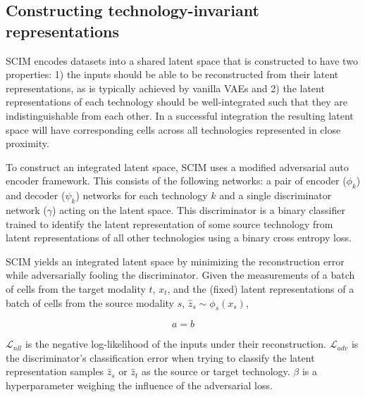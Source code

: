 \subsection{Constructing technology-invariant representations}
SCIM encodes datasets into a shared latent space that is constructed to have two properties:
1) the inputs should be able to be reconstructed from their latent representations, as is typically achieved by vanilla VAEs
and 2) the latent representations of each technology should be well-integrated such that they are indistinguishable from each other.
In a successful integration the resulting latent space will have corresponding cells across all technologies represented in close proximity.

To construct an integrated latent space, SCIM uses a modified adversarial auto encoder framework.
This consists of the following networks: a pair of encoder ($\phi_k$) and decoder ($\psi_k$) networks for each technology $k$ and a single discriminator network ($\gamma$) acting on the latent space.
This discriminator is a binary classifier trained to identify the latent representation of some source technology from latent representations of all other technologies using a binary cross entropy loss.

SCIM yields an integrated latent space by minimizing the reconstruction error while adversarially fooling the discriminator.
Given the measurements of a batch of cells from the target modality $t$, $x_t$, and the (fixed) latent representations of a batch of cells from the source modality $s$, $\hat{z}_s \sim \phi_s(x_s)$,

\begin{equation}
	a = b
  \label{eq:scim-loss}
\end{equation}

$\mathcal{L}_{nll}$ is the negative log-likelihood of the inputs under their reconstruction.
$\mathcal{L}_{adv}$ is the discriminator’s classification error when trying to classify the latent representation samples $\hat{z}_s$ or $\hat{z}_t$ as the source or target technology.
$\beta$ is a hyperparameter weighing the influence of the adversarial loss.

